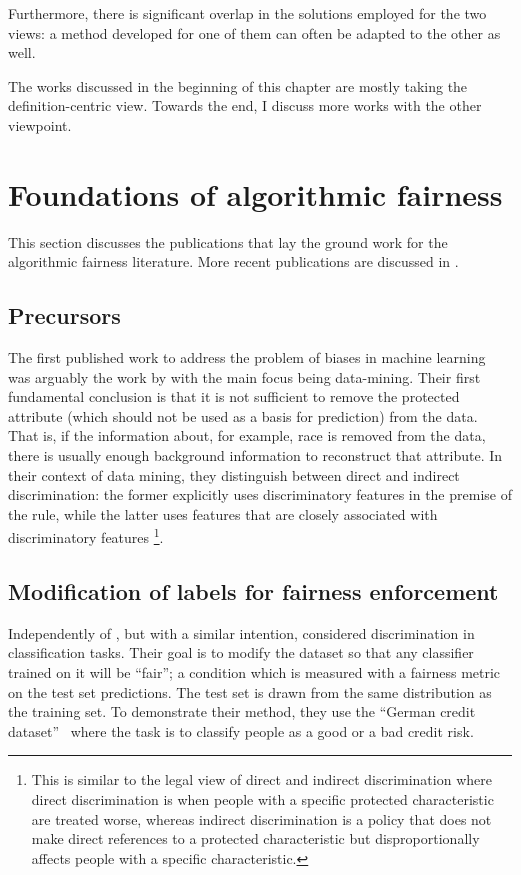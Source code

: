 Furthermore, there is significant overlap in the solutions employed for the two views:
a method developed for one of them can often be adapted to the other as well.

The works discussed in the beginning of this chapter are mostly taking the definition-centric view.
Towards the end, I discuss more works with the other viewpoint.

\section{Foundations of algorithmic fairness}\label{sec:foundations}
This section discusses the publications that lay the ground work for the algorithmic fairness literature.
More recent publications are discussed in %
.

\subsection{Precursors}\label{precursor}
The first published work to address the problem of biases in machine learning
was arguably the work by \citet{pedreshi2008discrimination}
with the main focus being data-mining.
Their first fundamental conclusion
is that it is not sufficient to remove the protected attribute
(which should not be used as a basis for prediction) from the data.
That is, if the information about, for example, race
is removed from the data,
there is usually enough background information to reconstruct that attribute.
In their context of data mining,
they distinguish between direct and indirect discrimination:
the former explicitly uses discriminatory features in the premise of the rule,
while the latter uses features that are closely associated with discriminatory features%
\footnote{This is similar to the legal view of direct and indirect discrimination
where direct discrimination is when people with a specific protected characteristic are treated worse,
whereas indirect discrimination is a policy that does not make direct references to a protected characteristic
but disproportionally affects people with a specific characteristic.}.

\subsection{Modification of labels for fairness enforcement}%
\label{modification-of-labels-for-fairness-enforcement}
Independently of \citet{pedreshi2008discrimination}, but with a similar intention,
\citet{kamiran2009classifying} considered discrimination in classification tasks.
Their goal is to modify the dataset so that any classifier trained on it will be ``fair'';
a condition which is measured with a fairness metric on the test set predictions.
The test set is drawn from the same distribution as the training set.
To demonstrate their method, they use the ``German credit dataset''~\citep{Dua:2017}
where the task is to classify people as a good or a bad credit risk.

